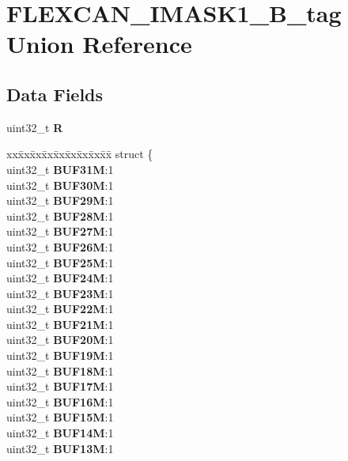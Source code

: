 \hypertarget{unionFLEXCAN__IMASK1__32B__tag}{}\section{F\+L\+E\+X\+C\+A\+N\+\_\+\+I\+M\+A\+S\+K1\+\_\+B\+\_\+tag Union Reference}
\label{unionFLEXCAN__IMASK1__32B__tag}
\subsection*{Data Fields}
\begin{DoxyCompactItemize}
\item 
\mbox{\label{unionFLEXCAN__IMASK1__32B__tag_ada720104c24d3d5ba49008c214c27f9d}} 
uint32\+\_\+t {\bfseries R}
\item 
\mbox{\label{unionFLEXCAN__IMASK1__32B__tag_a243dc804bd04a436dd28b6a59e0ef564}} 
\begin{tabbing}
xx\=xx\=xx\=xx\=xx\=xx\=xx\=xx\=xx\=\kill
struct \{\\
\>uint32\_t {\bfseries BUF31M}:1\\
\>uint32\_t {\bfseries BUF30M}:1\\
\>uint32\_t {\bfseries BUF29M}:1\\
\>uint32\_t {\bfseries BUF28M}:1\\
\>uint32\_t {\bfseries BUF27M}:1\\
\>uint32\_t {\bfseries BUF26M}:1\\
\>uint32\_t {\bfseries BUF25M}:1\\
\>uint32\_t {\bfseries BUF24M}:1\\
\>uint32\_t {\bfseries BUF23M}:1\\
\>uint32\_t {\bfseries BUF22M}:1\\
\>uint32\_t {\bfseries BUF21M}:1\\
\>uint32\_t {\bfseries BUF20M}:1\\
\>uint32\_t {\bfseries BUF19M}:1\\
\>uint32\_t {\bfseries BUF18M}:1\\
\>uint32\_t {\bfseries BUF17M}:1\\
\>uint32\_t {\bfseries BUF16M}:1\\
\>uint32\_t {\bfseries BUF15M}:1\\
\>uint32\_t {\bfseries BUF14M}:1\\
\>uint32\_t {\bfseries BUF13M}:1\\

\end{tabbing}
\end{DoxyCompactItemize}
